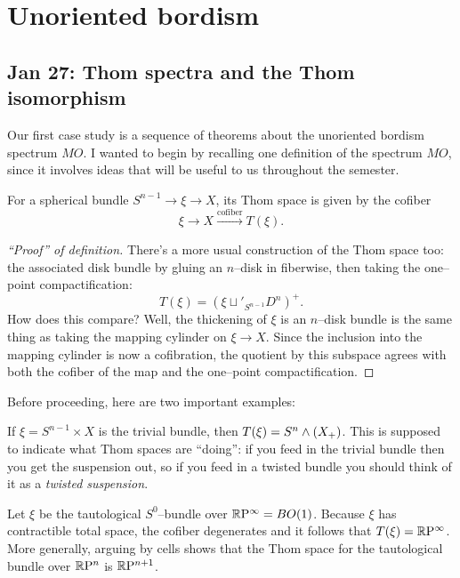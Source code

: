 
\chapter{Unoriented bordism}


\section{Jan 27: Thom spectra and the Thom isomorphism}

Our first case study is a sequence of theorems about the unoriented bordism spectrum $MO$.  I wanted to begin by recalling one definition of the spectrum $MO$, since it involves ideas that will be useful to us throughout the semester.

\begin{definition}
For a spherical bundle $S^{n-1} \to \xi \to X$, its Thom space is given by the cofiber \[\xi \to X \xrightarrow{\text{cofiber}} T(\xi).\]
\end{definition}
\begin{proof}[``Proof'' of definition]
There's a more usual construction of the Thom space too: the associated disk bundle by gluing an $n$--disk in fiberwise, then taking the one--point compactification: \[T(\xi) = (\xi \sqcup'_{S^{n-1}} D^n)^+.\] How does this compare? Well, the thickening of $\xi$ is an $n$--disk bundle is the same thing as taking the mapping cylinder on $\xi \to X$. Since the inclusion into the mapping cylinder is now a cofibration, the quotient by this subspace agrees with both the cofiber of the map and the one--point compactification.
\end{proof}

Before proceeding, here are two important examples:
\begin{example}\label{TrivialBundleThomExample}
If $\xi = S^{n-1} \times X$ is the trivial bundle, then $T(\xi) = S^n \wedge (X_+)$.  This is supposed to indicate what Thom spaces are ``doing'': if you feed in the trivial bundle then you get the suspension out, so if you feed in a twisted bundle you should think of it as a \textit{twisted suspension}.
\end{example}

\begin{example}\label{RPnThomExample}
Let $\xi$ be the tautological $S^0$--bundle over $\mathbb R\mathrm P^\infty = BO(1)$.  Because $\xi$ has contractible total space, the cofiber degenerates and it follows that $T(\xi) = \mathbb R\mathrm P^\infty$. More generally, arguing by cells shows that the Thom space for the tautological bundle over $\mathbb R\mathrm P^n$ is $\mathbb R\mathrm P^{n+1}$.
\end{example}

